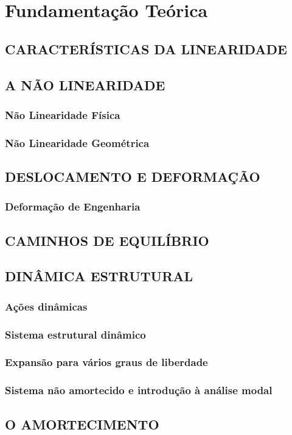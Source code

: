 \chapter{Fundamentação Teórica}


\section{CARACTERÍSTICAS DA LINEARIDADE} \label{Sec:caraclinearidade}


\section{A NÃO LINEARIDADE} \label{Sec:anaolinearidade}


\subsection{Não Linearidade Física}


\subsection{Não Linearidade Geométrica} 


\section{DESLOCAMENTO E DEFORMAÇÃO} \label{Sec:deslocedeform}

\subsection {Deformação de Engenharia} \label{Sec:desloceng}

\section{CAMINHOS DE EQUILÍBRIO} \label{Sec:caminhodeequilíbrio}


\section{DINÂMICA ESTRUTURAL} \label{Sec:dinamicaestrutural}
 

\subsection{Ações dinâmicas}

\subsection{Sistema estrutural dinâmico}

\subsection{Expansão para vários graus de liberdade} \label{Sec:Expans}

\subsection{Sistema não amortecido e introdução à análise modal} \label{Sec:anlmodal}

\section{O AMORTECIMENTO}
